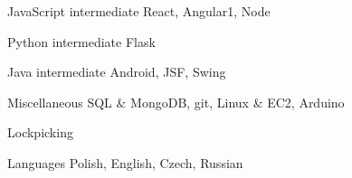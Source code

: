
\begin{cvskills}

	\cvskill
		{JavaScript}
		{intermediate}
		{React, Angular1, Node}

	\cvskill
		{Python}
		{intermediate}
		{Flask}

	\cvskill
		{Java}
		{intermediate}
		{Android, JSF, Swing}

	\cvskill
		{Miscellaneous}
		{}
		{SQL \& MongoDB, git, Linux \& EC2, Arduino}

	\cvskill
		{Lockpicking}
		{}
		{}

	\cvskill
		{Languages}
		{}
		{Polish, English, Czech, Russian}

\end{cvskills}
